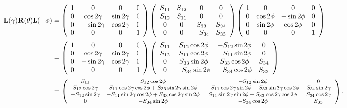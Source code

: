 \documentclass[english,a4paper]{my_memo}
\begin{document}
\begin{align*}
\mathbf{L}(\gamma)\mathbf{R}(\theta)\mathbf{L}(-\phi)
& = \left(\begin{array}{cccc}
1 & 0 & 0 & 0\\
0 & \cos2\gamma & \sin2\gamma & 0\\
0 & -\sin2\gamma & \cos2\gamma & 0\\
0 & 0 & 0 & 1
\end{array}\right)
\left(\begin{array}{cccc}
S_{11} & S_{12} & 0 & 0\\
S_{12} & S_{11} & 0 & 0\\
0 & 0 & S_{33} & S_{34}\\
0 & 0 & -S_{34} & S_{33}
\end{array}\right)
\left(\begin{array}{cccc}
1 & 0 & 0 & 0\\
0 & \cos2\phi & -\sin2\phi & 0\\
0 & \sin2\phi & \cos2\phi & 0\\
0 & 0 & 0 & 1
\end{array}\right)\\[2pt]
& = \left(\begin{array}{cccc}
1 & 0 & 0 & 0\\
0 & \cos2\gamma & \sin2\gamma & 0\\
0 & -\sin2\gamma & \cos2\gamma & 0\\
0 & 0 & 0 & 1
\end{array}\right)
\left(\begin{array}{cccc}
S_{11} & S_{12}\cos2\phi & -S_{12}\sin2\phi & 0\\
S_{12} & S_{11}\cos2\phi & -S_{11}\sin2\phi & 0\\
0 & S_{33}\sin2\phi & S_{33}\cos2\phi & S_{34}\\
0 & -S_{34}\sin2\phi & -S_{34}\cos2\phi & S_{33}
\end{array}\right)\\[2pt]
& = {\footnotesize\left(\begin{array}{cccc}
S_{11} & S_{12}\cos2\phi & -S_{12}\sin2\phi & 0\\
S_{12}\cos2\gamma & S_{11}\cos2\gamma\cos2\phi+S_{33}\sin2\gamma\sin2\phi & -S_{11}\cos2\gamma\sin2\phi+S_{33}\sin2\gamma\cos2\phi & S_{34}\sin2\gamma\\
-S_{12}\sin2\gamma & -S_{11}\sin2\gamma\cos2\phi+S_{33}\cos2\gamma\sin2\phi & S_{11}\sin2\gamma\sin2\phi+S_{33}\cos2\gamma\cos2\phi & S_{34}\cos2\gamma\\
0 & -S_{34}\sin2\phi & -S_{34}\cos2\phi & S_{33}
\end{array}\right).}
\end{align*}
\end{document}
